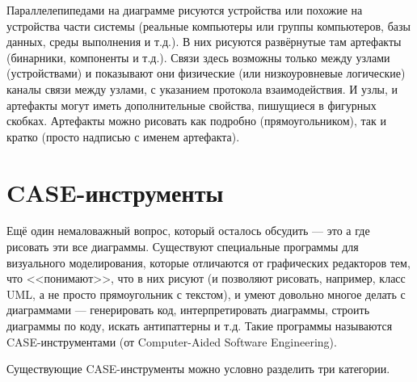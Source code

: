\documentclass{../../text-style}
\begin{document}
Параллелепипедами на диаграмме рисуются устройства или похожие на устройства части системы (реальные компьютеры или группы компьютеров, базы данных, среды выполнения и т.д.). В них рисуются развёрнутые там артефакты (бинарники, компоненты и т.д.). Связи здесь возможны только между узлами (устройствами) и показывают они физические (или низкоуровневые логические) каналы связи между узлами, с указанием протокола взаимодействия. И узлы, и артефакты могут иметь дополнительные свойства, пишущиеся в фигурных скобках. Артефакты можно рисовать как подробно (прямоугольником), так и кратко (просто надписью с именем артефакта).

\section{CASE-инструменты}

Ещё один немаловажный вопрос, который осталось обсудить --- это а где рисовать эти все диаграммы. Существуют специальные программы для визуального моделирования, которые отличаются от графических редакторов тем, что <<понимают>>, что в них рисуют (и позволяют рисовать, например, класс UML, а не просто прямоугольник с текстом), и умеют довольно многое делать с диаграммами --- генерировать код, интерпретировать диаграммы, строить диаграммы по коду, искать антипаттерны и т.д. Такие программы называются CASE-инструментами (от Computer-Aided Software Engineering).

Существующие CASE-инструменты можно условно разделить три категории.
\end{document}
